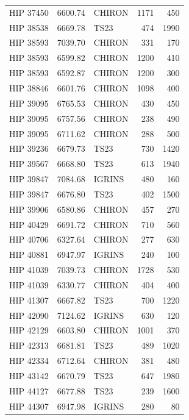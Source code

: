 \begin{scriptsize}
\begin{longtable}{|l|rlrr|}
   HIP 37450 &  6600.74 &     CHIRON &     1171 &   450 \\
   HIP 38538 &  6669.78 &       TS23 &      474 &  1990 \\
   HIP 38593 &  7039.70 &     CHIRON &      331 &   170 \\
   HIP 38593 &  6599.82 &     CHIRON &     1200 &   410 \\
   HIP 38593 &  6592.87 &     CHIRON &     1200 &   300 \\
   HIP 38846 &  6601.76 &     CHIRON &     1098 &   400 \\
   HIP 39095 &  6765.53 &     CHIRON &      430 &   450 \\
   HIP 39095 &  6757.56 &     CHIRON &      238 &   490 \\
   HIP 39095 &  6711.62 &     CHIRON &      288 &   500 \\
   HIP 39236 &  6679.73 &       TS23 &      730 &  1420 \\
   HIP 39567 &  6668.80 &       TS23 &      613 &  1940 \\
   HIP 39847 &  7084.68 &     IGRINS &      480 &   160 \\
   HIP 39847 &  6676.80 &       TS23 &      402 &  1500 \\
   HIP 39906 &  6580.86 &     CHIRON &      457 &   270 \\
   HIP 40429 &  6691.72 &     CHIRON &      710 &   560 \\
   HIP 40706 &  6327.64 &     CHIRON &      277 &   630 \\
   HIP 40881 &  6947.97 &     IGRINS &      240 &   100 \\
   HIP 41039 &  7039.73 &     CHIRON &     1728 &   530 \\
   HIP 41039 &  6330.77 &     CHIRON &      404 &   400 \\
   HIP 41307 &  6667.82 &       TS23 &      700 &  1220 \\
   HIP 42090 &  7124.62 &     IGRINS &      630 &   120 \\
   HIP 42129 &  6603.80 &     CHIRON &     1001 &   370 \\
   HIP 42313 &  6681.81 &       TS23 &      489 &  1020 \\
   HIP 42334 &  6712.64 &     CHIRON &      381 &   480 \\
   HIP 43142 &  6670.79 &       TS23 &      647 &  1980 \\
   HIP 44127 &  6677.88 &       TS23 &      239 &  1600 \\
   HIP 44307 &  6947.98 &     IGRINS &      280 &    80 \\

\end{longtable}
\end{scriptsize}
